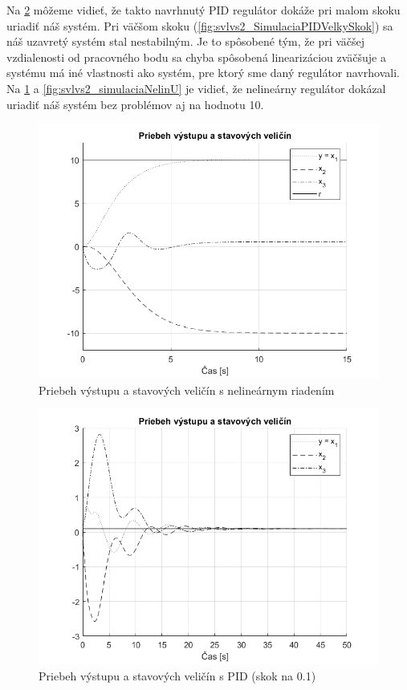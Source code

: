 \documentclass[../main.tex]{subfiles}
\begin{document}
Na \cref{fig:svlvs2_SimulaciaPID} môžeme vidieť, že takto navrhnutý PID regulátor dokáže pri malom skoku uriadiť náš systém. Pri väčšom skoku (\cref{fig:svlvs2_SimulaciaPIDVelkySkok}) sa náš uzavretý systém stal nestabilným. Je to spôsobené tým, že pri väčšej vzdialenosti od pracovného bodu sa chyba spôsobená linearizáciou zväčšuje a systému má iné vlastnosti ako systém, pre ktorý sme daný regulátor navrhovali.
Na \cref{fig:svlvs2_simulaciaNelin} a \cref{fig:svlvs2_simulaciaNelinU} je vidieť, že nelineárny regulátor dokázal uriadiť náš systém bez problémov aj na hodnotu 10.

	\begin{figure}[h!]
		\centering
		\includegraphics[width=0.8\linewidth]{SimulaciaNelin}
		\caption{Priebeh výstupu a stavových veličín s nelineárnym riadením}
		\label{fig:svlvs2_simulaciaNelin}
	\end{figure}

	\begin{figure}[h!]
		\centering
		\includegraphics[width=0.8\linewidth]{SimulaciaPID}
		\caption{Priebeh výstupu a stavových veličín s PID (skok na 0.1)}
		\label{fig:svlvs2_SimulaciaPID}
	\end{figure}
\end{document}
